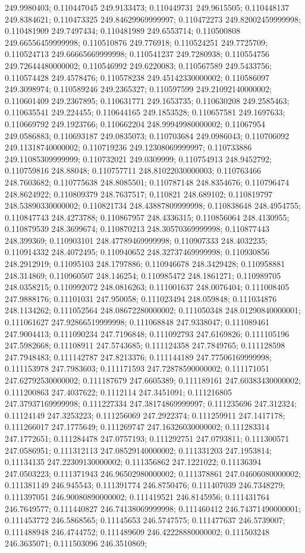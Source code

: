 249.9980403; 0.110447045 249.9133473; 0.110449731 249.9615505; 0.110448137 249.8384621; 0.110473325 249.84629969999997; 0.110472273 249.82002459999998; 0.110481909 249.7497434; 0.110481989 249.6553714; 0.110500808 249.66556459999998; 0.110510876 249.776918; 0.110524251 249.7725709; 0.110524713 249.66665669999998; 0.110541237 249.7280938; 0.110554756 249.72644480000002; 0.110546992 249.6220083; 0.110567589 249.5433756; 0.110574428 249.4578476; 0.110578238 249.45142330000002; 0.110586097 249.3098974; 0.110589246 249.2365327; 0.110597599 249.21092140000002; 0.110601409 249.2367895; 0.110631771 249.1653735; 0.110630208 249.2585463; 0.110635541 249.224455; 0.110644165 249.1853528; 0.110657581 249.1697633; 0.110669792 249.1923766; 0.110662204 248.99949980000002; 0.11067954 249.0586883; 0.110693187 249.0835073; 0.110703684 249.0986043; 0.110706092 249.11318740000002; 0.110719236 249.12308069999997; 0.110733886 249.11085309999999; 0.110732021 249.0309999; 0.110754913 248.9452792; 0.110759816 248.88048; 0.110757711 248.81022030000003; 0.110763466 248.7603682; 0.110775638 248.8085501; 0.110787148 248.8354676; 0.110796474 248.8624922; 0.110809379 248.7637517; 0.110821 248.689102; 0.110819797 248.53890330000002; 0.110821734 248.43887809999998; 0.110838648 248.4954755; 0.110847743 248.4273788; 0.110867957 248.4336315; 0.110856064 248.4130955; 0.110879539 248.3699674; 0.110870213 248.30570369999998; 0.110877443 248.399369; 0.110903101 248.47789469999998; 0.110907333 248.4032235; 0.110914332 248.4072495; 0.110940652 248.32737469999998; 0.110930856 248.2912919; 0.11095103 248.1797886; 0.110946678 248.3429428; 0.110958881 248.314869; 0.110960507 248.146254; 0.110985472 248.1861271; 0.110989705 248.0358215; 0.110992072 248.0816263; 0.111001637 248.0076404; 0.111008405 247.9888176; 0.11101031 247.950058; 0.111023494 248.059848; 0.111034876 248.1134262; 0.111052564 248.08672280000002; 0.111050348 248.01290840000001; 0.111061627 247.92866519999998; 0.111068848 247.9338047; 0.111089461 247.9004413; 0.111090234 247.7196848; 0.111092793 247.6169826; 0.111105196 247.5982668; 0.11108911 247.5743685; 0.111124358 247.7849765; 0.111128598 247.7948483; 0.111142787 247.8213376; 0.111144189 247.77506169999998; 0.111153978 247.7983603; 0.111171593 247.72878590000002; 0.111171051 247.62792530000002; 0.111187679 247.6605389; 0.111189161 247.60383430000002; 0.111200863 247.4037622; 0.1112114 247.3451091; 0.111216805 247.37937169999998; 0.111227334 247.38174869999997; 0.111235696 247.312324; 0.11124149 247.3253223; 0.111256069 247.2922374; 0.111259911 247.1417178; 0.111266017 247.1775649; 0.111269747 247.16326030000002; 0.111283314 247.1772651; 0.111284478 247.0757193; 0.111292751 247.0793811; 0.111300571 247.0586951; 0.111312113 247.08529140000002; 0.111331203 247.1953814; 0.11134135 247.22309130000002; 0.111356862 247.1221022; 0.11136394 247.0503223; 0.111371943 246.96502980000002; 0.111378861 247.04606080000002; 0.111381149 246.945543; 0.111391774 246.8750476; 0.111407039 246.7348279; 0.111397051 246.90080890000002; 0.111419521 246.8145956; 0.111431764 246.7649577; 0.111440827 246.74138069999998; 0.111460412 246.74371490000001; 0.111453772 246.5868565; 0.11145653 246.5747575; 0.111477637 246.5739007; 0.111488948 246.4744752; 0.111489609 246.42228880000002; 0.111503248 246.3635071; 0.111503096 246.3510869; 